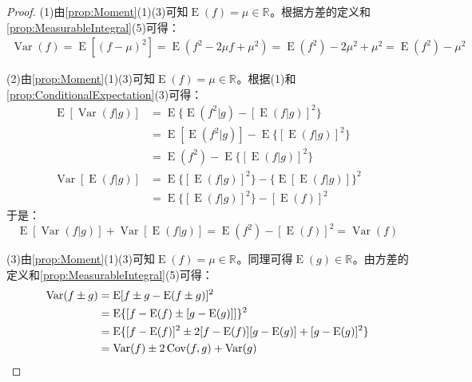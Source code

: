 \begin{proof}
	(1)由\cref{prop:Moment}(1)(3)可知$\operatorname{E}(f)=\mu\in\mathbb{R}^{}$。根据方差的定义和\cref{prop:MeasurableIntegral}(5)可得：
	\begin{align*}
		\operatorname{Var}(f)
		=\operatorname{E}[(f-\mu)^2]
		=\operatorname{E}(f^2-2\mu f+\mu^2)
		=\operatorname{E}(f^2)-2\mu^2+\mu^2
		=\operatorname{E}(f^2)-\mu^2
	\end{align*}\par
	(2)由\cref{prop:Moment}(1)(3)可知$\operatorname{E}(f)=\mu\in\mathbb{R}^{}$。根据(1)和\cref{prop:ConditionalExpectation}(3)可得：
	\begin{align*}
		\operatorname{E}[\operatorname{Var}(f|g)]
		&=\operatorname{E}\{\operatorname{E}(f^2|g)-[\operatorname{E}(f|g)]^2\} \\
		&=\operatorname{E}[\operatorname{E}(f^2|g)]-\operatorname{E}\{[\operatorname{E}(f|g)]^2\} \\
		&=\operatorname{E}(f^2)-\operatorname{E}\{[\operatorname{E}(f|g)]^2\} \\
		\operatorname{Var}[\operatorname{E}(f|g)]
		&=\operatorname{E}\{[\operatorname{E}(f|g)]^2\}-\{\operatorname{E}[\operatorname{E}(f|g)]\}^2 \\
		&=\operatorname{E}\{[\operatorname{E}(f|g)]^2\}-[\operatorname{E}(f)]^2
	\end{align*}
	于是：
	\begin{equation*}
		\operatorname{E}[\operatorname{Var}(f|g)]+\operatorname{Var}[\operatorname{E}(f|g)]=\operatorname{E}(f^2)-[\operatorname{E}(f)]^2=\operatorname{Var}(f)
	\end{equation*}\par
	(3)由\cref{prop:Moment}(1)(3)可知$\operatorname{E}(f)=\mu\in\mathbb{R}^{}$。同理可得$\operatorname{E}(g)\in\mathbb{R}^{}$。由方差的定义和\cref{prop:MeasurableIntegral}(5)可得：
	\begin{align*}
		\operatorname{Var}(f\pm g)
		&=\operatorname{E}[f\pm g-\operatorname{E}(f\pm g)]^2 \\
		&=\operatorname{E}\{[f-\operatorname{E}(f)\pm[g-\operatorname{E}(g)]]\}^2 \\
		&=\operatorname{E}\{[f-\operatorname{E}(f)]^2\pm 2[f-\operatorname{E}(f)][g-\operatorname{E}(g)]+[g-\operatorname{E}(g)]^2\} \\
		&=\operatorname{Var}(f)\pm2\operatorname{Cov}(f,g)+\operatorname{Var}(g)\qedhere
	\end{align*}
\end{proof}

